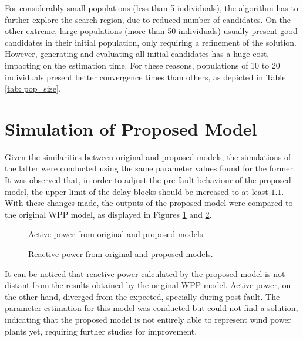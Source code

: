 For considerably small populations (less than 5 individuals), the algorithm has to further explore the search region, due to reduced number of candidates. On the other extreme, large populations (more than 50 individuals) usually present good candidates in their initial population, only requiring a refinement of the solution. However, generating and evaluating all initial candidates has a huge cost, impacting on the estimation time. For these reasons, populations of 10 to 20 individuals present better convergence times than others, as depicted in Table \ref{tab: pop_size}.

\section{Simulation of Proposed Model}

Given the similarities between original and proposed models, the simulations of the latter were conducted using the same parameter values found for the former. It was observed that, in order to adjust the pre-fault behaviour of the proposed model, the upper limit of the delay blocks should be increased to at least $1.1$. With these changes made, the outputs of the proposed model were compared to the original WPP model, as displayed in Figures \ref{fig: proposed_P} and \ref{fig: proposed_Q}.

\begin{figure}[h]
	\begin{center}
		\caption{Active power from original and proposed models.}
	\end{center}
	\label{fig: proposed_P}
\end{figure}

\begin{figure}[h]
	\begin{center}
		\caption{Reactive power from original and proposed models.}		
	\end{center}
	\label{fig: proposed_Q}
\end{figure}

It can be noticed that reactive power calculated by the proposed model is not distant from the results obtained by the original WPP model. Active power, on the other hand, diverged from the expected, specially during post-fault. The parameter estimation for this model was conducted but could not find a solution, indicating that the proposed model is not entirely able to represent wind power plants yet, requiring further studies for improvement.